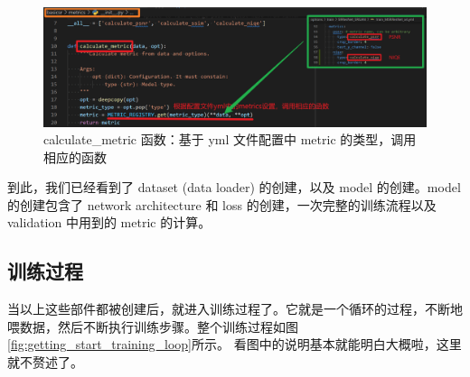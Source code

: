 \documentclass[../main.tex]{subfiles}
\begin{document}
\begin{enumerate}
\begin{enumerate}
                    \begin{figure}[h]
                        \begin{center}
                            \vspace{-0.2cm}
                            \includegraphics[width=0.85\linewidth]{figures/getting_start_calculate_metric.png}
                            \vspace{-0.3cm}
                            \caption{calculate\_metric 函数：基于 yml 文件配置中 metric 的类型，调用相应的函数}
                            \label{fig:getting_start_calculate_metric}
                        \end{center}
                        \vspace{-0.5cm}
                    \end{figure}

                    到此，我们已经看到了 dataset (data loader) 的创建，以及 model 的创建。model 的创建包含了 network architecture 和 loss 的创建，一次完整的训练流程以及 validation 中用到的 metric 的计算。
          \end{enumerate}
\end{enumerate}

\subsection{训练过程}\label{getting_start:training_procedure}

当以上这些部件都被创建后，就进入训练过程了。它就是一个循环的过程，不断地喂数据，然后不断执行训练步骤。整个训练过程如图\ref{fig:getting_start_training_loop}所示。
看图中的说明基本就能明白大概啦，这里就不赘述了。
\end{document}
